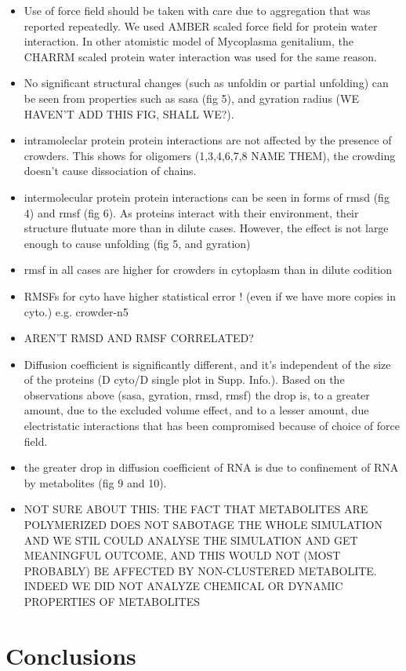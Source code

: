 \documentclass[journal=jacsat,manuscript=article]{achemso}
\begin{document}
 
 \begin{itemize}
  \item Use of force field should be taken with care due to aggregation that was reported repeatedly. We used AMBER scaled force field for protein water interaction. In other atomistic model of Mycoplasma genitalium, the CHARRM scaled protein water interaction was used for the same reason.
  \item No significant structural changes (such as unfoldin or partial unfolding) can be seen from properties such as sasa (fig 5), and gyration radius  (WE HAVEN'T ADD THIS FIG, SHALL WE?).
  \item intramoleclar protein protein interactions are not affected by the presence of crowders. This shows for oligomers (1,3,4,6,7,8 NAME THEM), the crowding doesn't cause dissociation of chains. 
  \item  intermolecular protein protein interactions can be seen in forms of  rmsd (fig 4) and rmsf (fig 6). As proteins interact with their environment, their structure flutuate more than in dilute cases. However, the effect is not large enough to cause unfolding (fig 5, and gyration)
  \item rmsf in all cases are higher for crowders in cytoplasm than in dilute codition
  \item RMSFs for cyto have higher statistical error ! (even if we have more copies in cyto.) e.g. crowder-n5
  \item AREN'T RMSD AND RMSF CORRELATED? 
  \item Diffusion coefficient is significantly different, and it's independent of the size of the proteins (D cyto/D single plot in Supp. Info.). Based on the observations above (sasa, gyration, rmsd, rmsf) the drop is, to a greater amount, due to the excluded volume effect, and to a lesser amount, due electristatic interactions that has been compromised because of choice of force field. 
  \item the greater drop in diffusion coefficient of RNA is due to confinement of RNA by metabolites (fig 9 and 10).
  \item NOT SURE ABOUT THIS: THE FACT THAT METABOLITES ARE POLYMERIZED DOES NOT SABOTAGE THE WHOLE SIMULATION AND WE STIL COULD ANALYSE THE SIMULATION AND GET MEANINGFUL OUTCOME, AND THIS WOULD NOT (MOST PROBABLY) BE AFFECTED BY NON-CLUSTERED METABOLITE. INDEED WE DID NOT ANALYZE CHEMICAL OR DYNAMIC PROPERTIES OF METABOLITES
 \end{itemize}

 
 
 
 
 

\section*{Conclusions}\label{sec:dissc}

 
 
 
 

 
\end{document}
